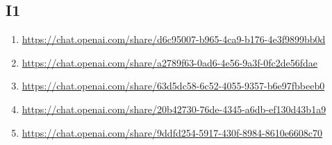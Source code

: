 \subsection{I1\label{I1-1}}

\begin{enumerate}
    \item \href{https://chat.openai.com/share/d6c95007-b965-4ca9-b176-4e3f9899bb0d}{https://chat.openai.com/share/d6c95007-b965-4ca9-b176-4e3f9899bb0d}
    \item \href{https://chat.openai.com/share/a2789f63-0ad6-4e56-9a3f-0fc2de56fdae}{https://chat.openai.com/share/a2789f63-0ad6-4e56-9a3f-0fc2de56fdae}
    \item \href{https://chat.openai.com/share/63d5dc58-6c52-4055-9357-b6e97fbbeeb0}{https://chat.openai.com/share/63d5dc58-6c52-4055-9357-b6e97fbbeeb0}
    \item \href{https://chat.openai.com/share/20b42730-76de-4345-a6db-ef130d43b1a9}{https://chat.openai.com/share/20b42730-76de-4345-a6db-ef130d43b1a9}
    \item \href{https://chat.openai.com/share/9ddfd254-5917-430f-8984-8610e6608c70}{https://chat.openai.com/share/9ddfd254-5917-430f-8984-8610e6608c70}
\end{enumerate}